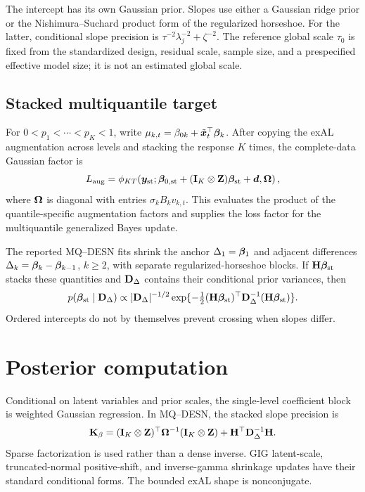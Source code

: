 The intercept has its own Gaussian prior. Slopes use either a Gaussian ridge
prior or the Nishimura--Suchard product form of the regularized horseshoe. For
the latter, conditional slope precision is
\(\tau^{-2}\lambda_j^{-2}+\zeta^{-2}\). The reference global scale
\(\tau_0\) is fixed from the standardized design, residual scale, sample size,
and a prespecified effective model size; it is not an estimated global scale.

\subsection{Stacked multiquantile target}

For \(0<p_1<\cdots<p_K<1\), write
\(\mu_{k,t}=\beta_{0k}+\tilde{\boldsymbol{x}}_t^\top\boldsymbol{\beta}_k\). After copying
the exAL augmentation across levels and stacking the response \(K\) times,
the complete-data Gaussian factor is
\begin{equation}
L_{\mathrm{aug}}
=\phi_{KT}\!\left(
\boldsymbol{y}_{\mathrm{st}};
\boldsymbol{\beta}_{0,\mathrm{st}}+
(\mathbf{I}_K\otimes\mathbf{Z})\boldsymbol{\beta}_{\mathrm{st}}+\boldsymbol{d},
\mathbf{\Omega}\right),
\label{qdesn2026:eq:supp_joint_stacked_likelihood}
\end{equation}
where \(\mathbf{\Omega}\) is diagonal with entries
\(\sigma_kB_kv_{k,t}\). This evaluates the product of the
quantile-specific augmentation factors and supplies the loss factor for the
multiquantile generalized Bayes update.

The reported MQ--DESN fits shrink the anchor
\(\Delta_1=\boldsymbol{\beta}_1\) and adjacent differences
\(\Delta_k=\boldsymbol{\beta}_k-\boldsymbol{\beta}_{k-1}\), \(k\ge2\), with separate
regularized-horseshoe blocks. If \(\mathbf{H}\boldsymbol{\beta}_{\mathrm{st}}\) stacks
these quantities and \(\mathbf{D}_\Delta\) contains their conditional prior
variances, then
\begin{equation}
p(\boldsymbol{\beta}_{\mathrm{st}}\mid\mathbf{D}_\Delta)
\propto |\mathbf{D}_\Delta|^{-1/2}
\exp\{-\tfrac12
(\mathbf{H}\boldsymbol{\beta}_{\mathrm{st}})^\top
\mathbf{D}_\Delta^{-1}(\mathbf{H}\boldsymbol{\beta}_{\mathrm{st}})\}.
\label{qdesn2026:eq:supp_joint_qvp_prior}
\end{equation}
Ordered intercepts do not by themselves prevent crossing when slopes differ.

\section{Posterior computation}
\label{app:qdesn-computation}

Conditional on latent variables and prior scales, the single-level
coefficient block is weighted Gaussian regression. In MQ--DESN, the stacked
slope precision is
\begin{equation}
\mathbf{K}_\beta
=(\mathbf{I}_K\otimes\mathbf{Z})^\top\mathbf{\Omega}^{-1}
(\mathbf{I}_K\otimes\mathbf{Z})
+\mathbf{H}^\top\mathbf{D}_\Delta^{-1}\mathbf{H}.
\label{qdesn2026:eq:supp_joint_beta_conditional}
\end{equation}
Sparse factorization is used rather than a dense inverse. GIG latent-scale,
truncated-normal positive-shift, and inverse-gamma shrinkage updates have their
standard conditional forms. The bounded exAL shape is nonconjugate.

